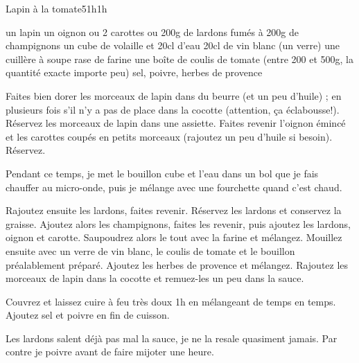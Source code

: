 \begin{recette}{Lapin à la tomate}{5}{1h}{1h}
\begin{ingredients}[4 pers.]
\ingredient un lapin
\ingredient un oignon
 ou 2 carottes
 ou 200g de lardons fumés
 à 200g de champignons
\ingredient un cube de volaille et 20cl d'eau
\ingredient 20cl de vin blanc (un verre)
\ingredient une cuillère à soupe rase de farine
\ingredient une boîte de coulis de tomate (entre 200 et 500g, la quantité exacte importe peu)
\ingredient sel, poivre, herbes de provence
\end{ingredients}

\begin{preparation}
\etape Faites bien dorer les morceaux de lapin dans du beurre (et un peu d'huile) ; en plusieurs fois s'il n'y a pas de place dans la cocotte (attention, ça éclabousse!).
\etape Réservez les morceaux de lapin dans une assiette.
\etape Faites revenir l'oignon émincé et les carottes coupés en petits morceaux (rajoutez un peu d'huile si besoin). Réservez.
\begin{remarque}
Pendant ce temps, je met le bouillon cube et l'eau dans un bol que je fais chauffer au micro-onde, puis je mélange avec une fourchette quand c'est chaud.
\end{remarque}
\etape Rajoutez ensuite les lardons, faites revenir. Réservez les lardons et conservez la graisse. 
\etape Ajoutez alors les champignons, faites les revenir, puis ajoutez les lardons, oignon et carotte.
\etape Saupoudrez alors le tout avec la farine et mélangez. 
\etape Mouillez ensuite avec un verre de vin blanc, le coulis de tomate et le bouillon préalablement préparé. Ajoutez les herbes de provence et mélangez.
\etape Rajoutez les morceaux de lapin dans la cocotte et remuez-les un peu dans la sauce.
\end{preparation}

\begin{cuisson}
Couvrez et laissez cuire à feu très doux 1h en mélangeant de temps en temps. Ajoutez sel et poivre en fin de cuisson.
\begin{remarque}
Les lardons salent déjà pas mal la sauce, je ne la resale quasiment jamais. Par contre je poivre avant de faire mijoter une heure.
\end{remarque}
\end{cuisson}
\end{recette}

